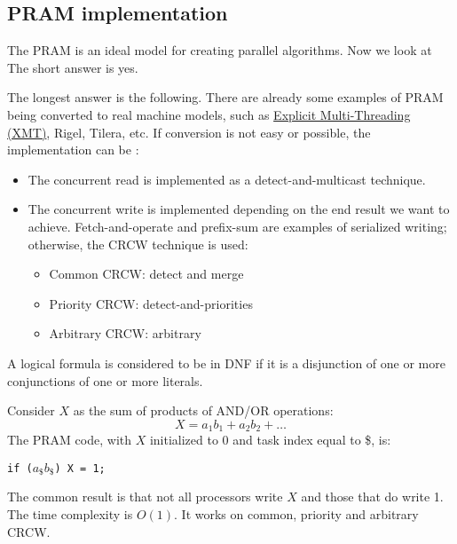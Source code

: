 \subsection{PRAM implementation}

The PRAM is an ideal model for creating parallel algorithms. Now we look at  The short answer is yes.

\highspace
The longest answer is the following. There are already some examples of PRAM being converted to real machine models, such as \href{https://en.wikipedia.org/wiki/Explicit_multi-threading}{Explicit Multi-Threading (XMT)}, Rigel, Tilera, etc. If conversion is not easy or possible, the implementation can be :
\begin{itemize}
    \item The concurrent read is implemented as a detect-and-multicast technique.
    \item The concurrent write is implemented depending on the end result we want to achieve. Fetch-and-operate and prefix-sum are examples of serialized writing; otherwise, the CRCW technique is used:
    \begin{itemize}
        \item Common CRCW: detect and merge
        \item Priority CRCW: detect-and-priorities
        \item Arbitrary CRCW: arbitrary
    \end{itemize}
\end{itemize}

\begin{examplebox}
    A logical formula is considered to be in DNF if it is a disjunction of one or more conjunctions of one or more literals.

    Consider $X$ as the sum of products of AND/OR operations:
    \begin{equation*}
        X = a_{1}b_{1} + a_{2}b_{2} + \dots
    \end{equation*}
    The PRAM code, with $X$ initialized to $0$ and task index equal to \$, is:
    \begin{center}
        \texttt{if ($a_{\$}b_{\$}$) X = 1;}
    \end{center}
    The common result is that not all processors write $X$ and those that do write 1. The time complexity is $O\left(1\right)$. It works on common, priority and arbitrary CRCW.
\end{examplebox}

